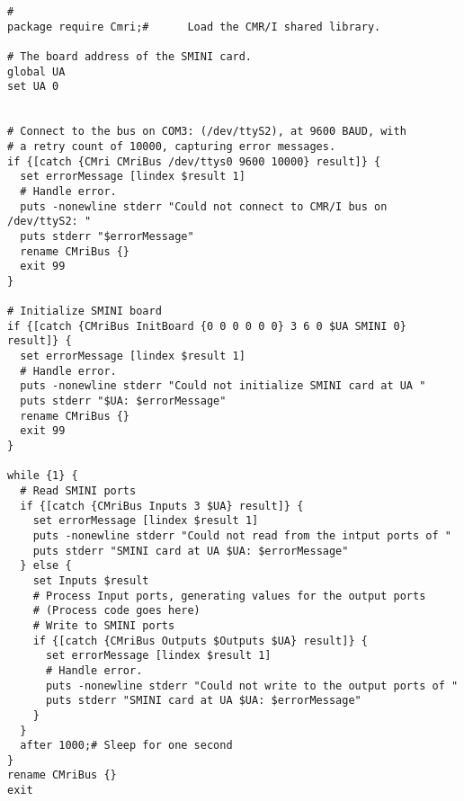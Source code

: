 \begin{lstlisting}[caption={Using the CMR/I from Tcl, more realistic version},
		   label=lst:CMRI:Tcl2]
#
package require Cmri;#		Load the CMR/I shared library.

# The board address of the SMINI card.
global UA
set UA 0


# Connect to the bus on COM3: (/dev/ttyS2), at 9600 BAUD, with
# a retry count of 10000, capturing error messages.
if {[catch {CMri CMriBus /dev/ttys0 9600 10000} result]} {
  set errorMessage [lindex $result 1]
  # Handle error.
  puts -nonewline stderr "Could not connect to CMR/I bus on /dev/ttyS2: "
  puts stderr "$errorMessage"
  rename CMriBus {}
  exit 99
}

# Initialize SMINI board
if {[catch {CMriBus InitBoard {0 0 0 0 0 0} 3 6 0 $UA SMINI 0} result]} {
  set errorMessage [lindex $result 1]
  # Handle error.
  puts -nonewline stderr "Could not initialize SMINI card at UA "
  puts stderr "$UA: $errorMessage"
  rename CMriBus {}
  exit 99
}

while {1} {
  # Read SMINI ports
  if {[catch {CMriBus Inputs 3 $UA} result]} {
    set errorMessage [lindex $result 1]
    puts -nonewline stderr "Could not read from the intput ports of "
    puts stderr "SMINI card at UA $UA: $errorMessage"
  } else {
    set Inputs $result
    # Process Input ports, generating values for the output ports
    # (Process code goes here)
    # Write to SMINI ports
    if {[catch {CMriBus Outputs $Outputs $UA} result]} {
      set errorMessage [lindex $result 1]
      # Handle error.
      puts -nonewline stderr "Could not write to the output ports of "
      puts stderr "SMINI card at UA $UA: $errorMessage"
    }
  }
  after 1000;# Sleep for one second
}
rename CMriBus {} 
exit 
\end{lstlisting} 



